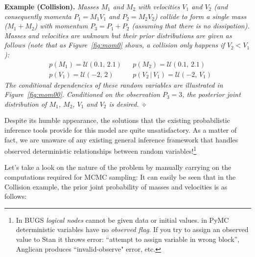 \documentclass{article}
\newcommand{\pr}{p}
\begin{document}
{\bf Example (Collision). }
\emph{Masses $M_1$ and $M_2$ with velocities $V_1$ and $V_2$ (and consequently momenta $P_1 = M_1 V_1$ and $P_2 = M_2 V_2$) collide to form a single mass ($M_1 + M_2$) with momentum $P_3 = P_1 + P_2$ (assuming that there is no dissipation).
Masses and velocities are unknown but 
their prior distributions are given as follows (note that as Figure~\ref{fig:mom0} shows, a collision only happens if $V_2 < V_1$):  
}%
\begin{align*}
&\pr(M_1) = \mathcal{U}(0.1, \, 2.1) 
&&\pr(M_2) = \mathcal{U}(0.1, \, 2.1)
\\
&\pr(V_1) = \mathcal{U}(-2, \, 2)
&&\pr(V_2 \, | \, V_1) = \mathcal{U}(-2, \, V_1)
\end{align*} 
\emph{
The conditional dependencies of these random variables are illustrated in 
Figure~\ref{fig:mom00}.
Conditioned on the observation $P_3 = 3$, the posterior joint distribution of $M_1$, $M_2$, $V_1$ and $V_2$ is desired. 
\hspace*{\fill} $\diamond$} %

Despite its humble appearance, the solutions that the existing probabilistic inference tools provide for this model are quite unsatisfactory. 
As a matter of fact, we are unaware of any existing general inference framework that 
handles observed deterministic relationships between random variables!\footnote{
In BUGS \emph{logical nodes} cannot be given data or initial values.
in PyMC deterministic variables have no \emph{observed flag}. 
If you try to assign an observed value to Stan it throws error: ``attempt to assign variable in wrong block'', 
Anglican produces ``invalid-observe" error, etc.}

Let's take a look on the nature of the problem by manually carrying on the computations required for MCMC sampling:
It can easily be seen that in the Collision example, the prior joint probability of masses and velocities is as follows:
\end{document}

